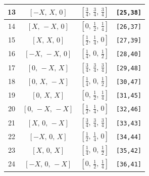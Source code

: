 \documentclass[fleqn,8pt]{jsarticle}
\begin{document}
\begin{longtable}{cccc}
13 & $\left[ - X,\, X,\, 0 \right]$ & $\left[ \frac{3}{4},\, \frac{3}{4},\, \frac{3}{4} \right]$ & {\tt [25,38]} \\ \hline
14 & $\left[ X,\, - X,\, 0 \right]$ & $\left[ 0,\, \frac{1}{2},\, \frac{1}{4} \right]$ & {\tt [26,37]} \\ \hline
15 & $\left[ X,\, X,\, 0 \right]$ & $\left[ \frac{1}{2},\, \frac{1}{4},\, 0 \right]$ & {\tt [27,39]} \\ \hline
16 & $\left[ - X,\, - X,\, 0 \right]$ & $\left[ \frac{1}{4},\, 0,\, \frac{1}{2} \right]$ & {\tt [28,40]} \\ \hline
17 & $\left[ 0,\, - X,\, X \right]$ & $\left[ \frac{3}{4},\, \frac{3}{4},\, \frac{3}{4} \right]$ & {\tt [29,48]} \\ \hline
18 & $\left[ 0,\, X,\, - X \right]$ & $\left[ \frac{1}{4},\, 0,\, \frac{1}{2} \right]$ & {\tt [30,47]} \\ \hline
19 & $\left[ 0,\, X,\, X \right]$ & $\left[ 0,\, \frac{1}{2},\, \frac{1}{4} \right]$ & {\tt [31,45]} \\ \hline
20 & $\left[ 0,\, - X,\, - X \right]$ & $\left[ \frac{1}{2},\, \frac{1}{4},\, 0 \right]$ & {\tt [32,46]} \\ \hline
21 & $\left[ X,\, 0,\, - X \right]$ & $\left[ \frac{3}{4},\, \frac{3}{4},\, \frac{3}{4} \right]$ & {\tt [33,43]} \\ \hline
22 & $\left[ - X,\, 0,\, X \right]$ & $\left[ \frac{1}{2},\, \frac{1}{4},\, 0 \right]$ & {\tt [34,44]} \\ \hline
23 & $\left[ X,\, 0,\, X \right]$ & $\left[ \frac{1}{4},\, 0,\, \frac{1}{2} \right]$ & {\tt [35,42]} \\ \hline
24 & $\left[ - X,\, 0,\, - X \right]$ & $\left[ 0,\, \frac{1}{2},\, \frac{1}{4} \right]$ & {\tt [36,41]} \\
\end{longtable}
\renewcommand{\arraystretch}{1.2}
\end{document}
